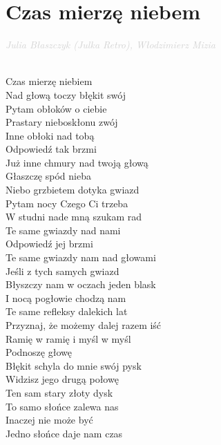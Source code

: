 \documentclass[a5paper, 10pt]{book}
\begin{document}
\section{Czas mierzę niebem}\textcolor{lightgray}{\textit{Julia Błaszczyk (Julka Retro), Włodzimierz Mizia\\}}~\\
\begin{minipage}[t]{0.6\textwidth}
  Czas mierzę niebiem			\\
  Nad głową toczy błękit swój			\\
  Pytam obłoków o ciebie			\\
  Prastary nieboskłonu zwój		\\
  Inne obłoki nad tobą			\\
  Odpowiedź tak brzmi			\\
  Już inne chmury nad twoją głową			\\
  
  Głaszczę spód nieba\\
  Niebo grzbietem dotyka gwiazd\\
  Pytam nocy Czego Ci trzeba\\
  W studni nade mną szukam rad\\
  Te same gwiazdy nad nami\\
  Odpowiedź jej brzmi\\
  Te same gwiazdy nam nad głowami\\
  
  Jeśli z tych samych gwiazd		\\
  Błyszczy nam w oczach jeden blask\\
  I nocą pogłowie chodzą nam		\\
  Te same refleksy dalekich lat		\\
  Przyznaj, że możemy dalej razem iść\\
  Ramię w ramię i myśl w myśl				\\
  
  Podnoszę głowę				\\
  Błękit schyla do mnie swój pysk		\\
  Widzisz jego drugą połowę			\\
  Ten sam stary złoty dysk			\\
  To samo słońce zalewa nas		\\
  Inaczej nie może być			\\
  Jedno słońce daje nam czas				\\
\end{minipage}
\end{document}
